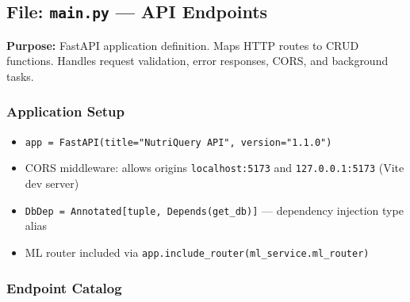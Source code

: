 \documentclass[12pt,a4paper]{article}
\begin{document}
\subsection{File: \texttt{main.py} — API Endpoints}

\textbf{Purpose:} FastAPI application definition. Maps HTTP routes to CRUD functions. Handles request validation, error responses, CORS, and background tasks.

\subsubsection{Application Setup}
\begin{itemize}[nosep]
    \item \texttt{app = FastAPI(title="NutriQuery API", version="1.1.0")}
    \item CORS middleware: allows origins \texttt{localhost:5173} and \texttt{127.0.0.1:5173} (Vite dev server)
    \item \texttt{DbDep = Annotated[tuple, Depends(get\_db)]} — dependency injection type alias
    \item ML router included via \texttt{app.include\_router(ml\_service.ml\_router)}
\end{itemize}

\subsubsection{Endpoint Catalog}
\end{document}

